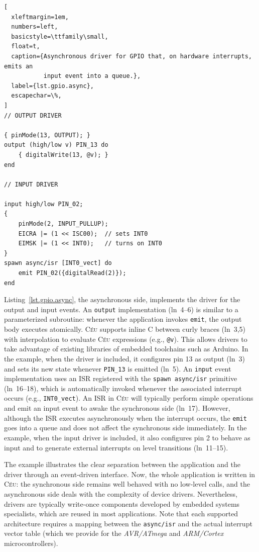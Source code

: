 \documentclass[sigplan,10pt,review,anonymous]{acmart}\settopmatter{printfolios=true,printccs=false,printacmref=false}
\newcommand{\CEU}{\textsc{C\'{e}u}\xspace}
\newcommand{\code}[1] {{\small{\texttt{#1}}}}
\begin{document}
\begin{lstlisting}[
  xleftmargin=1em,
  numbers=left,
  basicstyle=\ttfamily\small,
  float=t,
  caption={Asynchronous driver for GPIO that, on hardware interrupts, emits an
           input event into a queue.},
  label={lst.gpio.async},
  escapechar=\%,
]
// OUTPUT DRIVER

{ pinMode(13, OUTPUT); }
output (high/low v) PIN_13 do
    { digitalWrite(13, @v); }
end

// INPUT DRIVER

input high/low PIN_02;
{
    pinMode(2, INPUT_PULLUP);
    EICRA |= (1 << ISC00);  // sets INT0
    EIMSK |= (1 << INT0);   // turns on INT0
}
spawn async/isr [INT0_vect] do
    emit PIN_02({digitalRead(2)});
end
\end{lstlisting}

Listing~\ref{lst.gpio.async}, the asynchronous side, implements the driver for
the output and input events.
%
An \code{output} implementation (ln~4--6) is similar to a parameterized
subroutine: whenever the application invokes \code{emit}, the output body
executes atomically.
\CEU supports inline C between curly braces (ln~3,5) with interpolation to
evaluate \CEU expressions (e.g., \code{@v}).
This allows drivers to take advantage of existing libraries of embedded
toolchains such as Arduino.
%
In the example, when the driver is included, it configures pin 13 as output
(ln~3) and sets its new state whenever \code{PIN\_13} is emitted (ln~5).
%
An \code{input} event implementation uses an ISR registered with the
\code{spawn async/isr} primitive (ln~16--18), which is automatically invoked
whenever the associated interrupt occurs (e.g., \code{INT0\_vect}).
%
An ISR in \CEU will typically perform simple operations and emit an input event
to awake the synchronous side (ln~17).
However, although the ISR executes asynchronously when the interrupt occurs,
the \code{emit} goes into a queue and does not affect the synchronous side
immediately.
%
In the example, when the input driver is included, it also configures pin 2 to
behave as input and to generate external interrupts on level transitions
(ln~11--15).

The example illustrates the clear separation between the application and the
driver through an event-driven interface. %
%
Now, the whole application is written in \CEU:
    the synchronous side remains well behaved with no low-level calls, and
    the asynchronous side deals with the complexity of device drivers.
%
Nevertheless, drivers are typically write-once components developed by embedded
systems specialists, which are reused in most applications.
%
Note that each supported architecture requires a mapping between the
\code{async/isr} and the actual interrupt vector table (which we provide
for the \emph{AVR/ATmega} and \emph{ARM/Cortex} microcontrollers).
\end{document}
